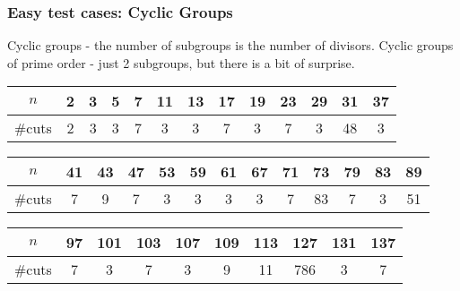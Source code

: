 \documentclass{beamer}
\newcommand{\jump}{\vskip6pt}
\begin{document}
\begin{frame}\frametitle{Easy test cases: Cyclic Groups}

Cyclic groups - the number of subgroups is the number of divisors.
\jump
Cyclic groups of prime order - just 2 subgroups, but there is a bit of surprise.
\begin{tabular}{c|c|c|c|c|c|c|c|c|c|c|c|c|}
$n$ & 2 & 3 & 5 & 7 & 11 & 13 & 17 & 19 & 23 & 29 & 31 & 37  \\
\hline
\#cuts & 2 & 3&  3& 7& 3& 3& 7& 3& 7& 3& 48 & 3 
\end{tabular}
\jump
\begin{tabular}{c|c|c|c|c|c|c|c|c|c|c|c|c|}
$n$ & 41 & 43 & 47 & 53 & 59 & 61 & 67 & 71 & 73 & 79 & 83 & 89  \\
\hline
\#cuts & 7 & 9 &  7& 3& 3& 3& 3& 7& 83 & 7& 3 & 51 
\end{tabular}
\jump
\begin{tabular}{c|c|c|c|c|c|c|c|c|c|}
$n$ & 97 & 101 & 103 & 107 & 109 & 113 & 127 & 131 & 137   \\
\hline
\#cuts & 7 & 3 &  7& 3& 9 & 11 & 786 & 3& 7
\end{tabular}


\end{frame}
\end{document}
